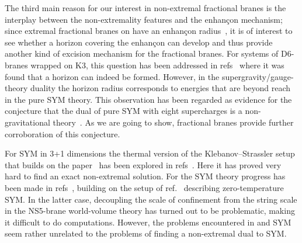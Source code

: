 \documentclass[a4paper,11pt]{article}
\providecommand{\ZZ}{\mathbb{Z}}  \providecommand{\Zint}{\mathbb{Z}}
\begin{document}
The third main reason for our interest in non-extremal fractional
branes is the interplay between the non-extremality features and the
enhan\c{c}on mechanism; since extremal fractional branes on \myHighlight{$T^4\!/\ZZ_2$}\coordHE{} 
have an enhan\c{c}on radius~\cite{Frau:2000gk}, it is of interest to see
whether a horizon covering the enhan\c{c}on can develop and thus provide
another kind of excision mechanism for the fractional branes. For systems
of D6-branes wrapped on K3, this question has been addressed in
refs~\cite{Johnson:1999qt,Johnson:2001wm} where it was found that a
horizon can indeed be formed. However, in the supergravity/gauge-theory
duality the horizon radius corresponds to energies that are beyond reach
in the pure SYM theory. This observation has been regarded as evidence
for the conjecture that the dual of pure SYM with eight supercharges is
a non-gravitational theory~\cite{Johnson:1999qt,Wijnholt:2001us}. As we
are going to show, fractional branes provide further corroboration of this
conjecture.

For \coordHE{} SYM in 3+1 dimensions the thermal version of the
Klebanov--Strassler setup~\cite{Klebanov:2000hb} that builds on the
paper~\cite{Klebanov:1996un} has been explored in
refs~\cite{Buchel:2000ch,Buchel:2001gw,Gubser:2001ri}. Here it has
proved very hard to find an exact non-extremal solution. For the
\coordHE{} SYM theory progress has been made in
refs~\cite{Freedman:2000xb,Maldacena:2000yy,Gubser:2001eg,Buchel:2001dg},
building on the setup of ref.~\cite{Polchinski:2000uf} describing
zero-temperature \coordHE{} SYM. In the latter case, decoupling
the scale of confinement from the string scale in the NS5-brane
world-volume theory has turned out to be problematic, making it
difficult to do computations. However, the problems encountered in
\coordHE{} and  \coordHE{} SYM seem rather unrelated to
the problems of finding a non-extremal dual to \coordHE{} SYM.
\end{document}
